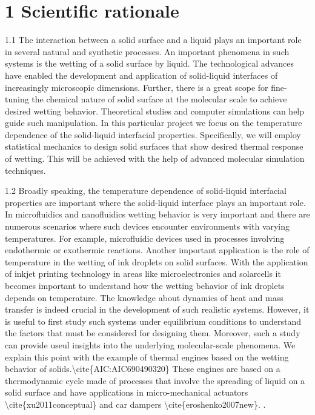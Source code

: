 \section{1 Scientific rationale}

\par 1.1 The interaction between a solid surface and a liquid plays an important role in several natural and synthetic processes. An important phenomena in such systems is the wetting of a solid surface by liquid. The technological advances have enabled the development and application of solid-liquid interfaces  of increasingly microscopic dimensions. Further, there is a great scope for fine-tuning the chemical nature of solid surface at the molecular scale to achieve desired wetting behavior. Theoretical studies and computer simulations can help guide such manipulation. In this particular project we focus on the temperature dependence of the solid-liquid interfacial properties. Specifically, we will employ statistical mechanics to design solid surfaces that show desired thermal response of wetting. This will be achieved with the help of advanced molecular simulation techniques.
\par 1.2 Broadly speaking, the temperature dependence of solid-liquid interfacial properties are important where the solid-liquid interface plays an important role. In microfluidics and nanofluidics wetting behavior is very important and there are numerous scenarios where such devices encounter environments with varying temperatures. For example, microfluidic devices used in processes involving endothermic or exothermic reactions. Another important application is the role of temperature in the wetting of ink droplets on solid surfaces. With the application of inkjet printing technology in areas like microelectronics and solarcells it becomes important to understand how the wetting behavior of ink droplets depends on temperature. The knowledge about dynamics of heat and mass transfer is indeed crucial in the development of such realistic systems. However, it is useful to first study such systems under equilibrium conditions to understand the factors that must be considered for designing them. Moreover, such a study can provide useul insights into the underlying molecular-scale phenomena. We explain this point with the example of thermal engines based on the wetting behavior of solids.\textbackslash cite\{AIC:AIC690490320\} These engines are based on a thermodynamic cycle made of processes that involve the spreading of liquid on a solid surface and have applications in micro-mechanical actuators \textbackslash cite\{xu2011conceptual\} and car dampers \textbackslash cite\{eroshenko2007new\}. .
